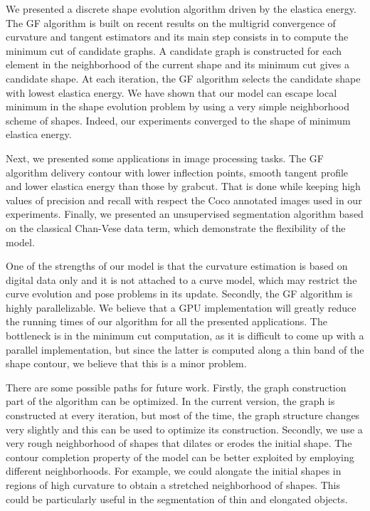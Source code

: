 \documentclass[smallextended]{svjour3}
\begin{document}
We presented a discrete shape evolution algorithm driven by the elastica energy. The GF algorithm is built on recent results on the multigrid convergence of curvature and tangent estimators and its main step consists in to compute the minimum cut of candidate graphs. A candidate graph is constructed for each element in the neighborhood of the current shape and its minimum cut gives a candidate shape. At each iteration, the GF algorithm selects the candidate shape with lowest elastica energy. We have shown that our model can escape local minimum in the shape evolution problem by using a very simple neighborhood scheme of shapes. Indeed, our experiments converged to the shape of minimum elastica energy. 

Next, we presented some applications in image processing tasks. The GF algorithm delivery contour with lower inflection points, smooth tangent profile and lower elastica energy than those by grabcut. That is done while keeping high values of precision and recall with respect the Coco annotated images used in our experiments. Finally, we presented an unsupervised segmentation algorithm based on the classical Chan-Vese data term, which demonstrate the flexibility of the model. 

One of the strengths of our model is that the curvature estimation is based on digital data only and it is not attached to a curve model, which may restrict the curve evolution and pose problems in its update. Secondly, the GF algorithm is highly parallelizable. We believe that a GPU implementation will greatly reduce the running times of our algorithm for all the presented applications. The bottleneck is in the minimum cut computation, as it is difficult to come up with a parallel implementation, but since the latter is computed along a thin band of the shape contour, we believe that this is a minor problem.

There are some possible paths for future work. Firstly, the graph construction part of the algorithm can be optimized. In the current version, the graph is constructed at every iteration, but most of the time, the graph structure changes very slightly and this can be used to optimize its construction. Secondly, we use a very rough neighborhood of shapes that dilates or erodes the initial shape. The contour completion property of the model can be better exploited by employing different neighborhoods. For example, we could alongate the initial shapes in regions of high curvature to obtain a stretched neighborhood of shapes. This could be particularly useful in the segmentation of thin and elongated objects.




\end{document}

